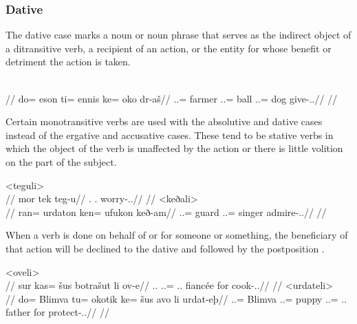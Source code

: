 \subsubsection{Dative}
\label{subsubsec:tvk-nouns-dative}

The dative case marks a noun or noun phrase that serves as the indirect object of a ditransitive verb, a recipient of an action, or the entity for whose benefit or detriment the action is taken.

	\begingl
		\glpreamble{}\\
		//
		\gla do= eson ti= ennis ke= oko dr-aš//
		\glb \An.\Sg.\Erg= farmer \In.\Sg.\Acc= ball \An.\Sg.\Dat= dog give-\Ind.\Npst.\Rtsp//
		\glft{}//
	\endgl
\xe

Certain monotransitive verbs are used with the absolutive and dative cases instead of the ergative and accusative cases. These tend to be stative verbs in which the object of the verb is unaffected by the action or there is little volition on the part of the subject.

	\a<teguli>\begingl
		\glpreamble{}\\
		//
		\gla mor tek teg-u//
		\glb \Fps.\Abs{} \Sps.\Dat{} worry-\Ind.\Npst.\Ipfv//
		\glft{}//
	\endgl
	\a<keðali>\begingl
		\glpreamble{}\\
		//
		\gla ran= urdaton ken= ufukon keð-am//
		\glb \An.\Pl.\Abs= guard \An.\Pl.\Dat= singer admire-\Ind.\Pst.\Ipfv//
		\glft{}//
	\endgl
\xe

When a verb is done on behalf of or for someone or something, the beneficiary of that action will be declined to the dative and followed by the postposition   .

	\a<oveli>\begingl
		\glpreamble{}\\
		//
		\gla sur kas= šus botrašut li ov-e//
		\glb \Tps.\An.\Abs{} \An.\Pc.\Dat= \Tps.\An.\Gen{} fiancée for cook-\Ind.\Npst.\Ipfv//
		\glft{}//
	\endgl
	\a<urdateli>\begingl
		\glpreamble{}\\
		//
		\gla do= Blimva tu= okotik ke= šus avo li urdat-eþ//
		\glb \An.\Sg.\Erg= Blimva \An.\Sg.\Acc= puppy \An.\Sg.\Dat= \Tps.\An.\Gen{} father for protect-\Ind.\Npst.\Prg//
		\glft{}//
	\endgl
\xe

